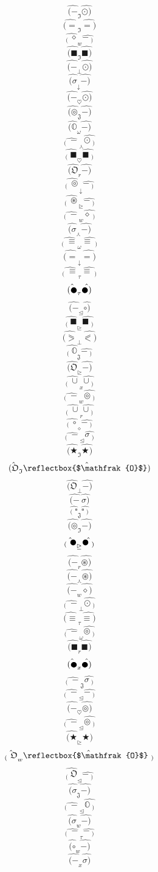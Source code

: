 \documentclass[12pt]{article}
\begin{document}
\begin{multicols}{5}
$$\hat{(-} _\mathfrak{I} \hat{\odot)}$$
$$\hat{(=} _\mathfrak{I} \hat{=)}$$
$$\hat{_( \ \diamond} _w \hat{-\ _)}$$
$$\hat{(\blacksquare} _\mathfrak{I} \hat{\blacksquare)}$$
$$\hat{(-} _\bot \hat{\odot)}$$
$$\hat{(\sigma} _\downarrow \hat{-)}$$
$$\hat{(-} _\heartsuit \hat{\odot)}$$
$$\hat{(\circledcirc} _\mathfrak{J} \hat{-)}$$
$$\hat{(\mathbb{O}} _\omega \hat{-)}$$
$$\hat{_( \ -} _\curlywedge \hat{\odot\ _)}$$
$$\hat{_( \ \blacksquare} _\heartsuit \hat{\blacksquare\ _)}$$
$$\hat{(\mathfrak{O}} _r \hat{-)}$$
$$\hat{_( \ \circledcirc} _\downarrow \hat{-\ _)}$$
$$\hat{_( \ \circledast} _\trianglerighteq \hat{-\ _)}$$
$$\hat{_( \ -} _w \hat{\diamond\ _)}$$
$$\hat{(\sigma} _\curlywedge \hat{-)}$$
$$\hat{_( \ \equiv} _\omega \hat{\equiv\ _)}$$
$$\hat{(=} _\downarrow \hat{=)}$$
$$\hat{_( \ \equiv} _\tau \hat{\equiv\ _)}$$
$$\hat{(\newmoon} _\tau \hat{\newmoon)}$$
$$\hat{(-} _\trianglelefteq \hat{\circ)}$$
$$\hat{_( \ \blacksquare} _\trianglerighteq \hat{\blacksquare\ _)}$$
$$\hat{(\eqslantgtr} _\bot \hat{\eqslantless)}$$
$$\hat{_( \ \mathbb{O}} _\mathfrak{J} \hat{-\ _)}$$
$$\hat{(\mathfrak{O}} _\trianglerighteq \hat{-)}$$
$$\hat{_( \ \cup} _x \hat{\cup\ _)}$$
$$\hat{_( \ -} _w \hat{\circledcirc\ _)}$$
$$\hat{_( \ \cup} _r \hat{\cup\ _)}$$
$$\hat{_( \ \circ} _\diamond \hat{-\ _)}$$
$$\hat{_( \ -} _\trianglelefteq \hat{\sigma\ _)}$$
$$\hat{(\bigstar} _\mathfrak{I} \hat{\bigstar)}$$
$$\hat{(\mathfrak{O}} _\mathfrak{I} \hat{\reflectbox{$\mathfrak{O}$})}$$
$$\hat{(\mathfrak{O}} _\bot \hat{-)}$$
$$\hat{(-} \  \hat{\sigma)}$$
$$\hat{_( \ \square} _\mathfrak{J} \hat{\square\ _)}$$
$$\hat{(\circledcirc} _\mathfrak{I} \hat{-)}$$
$$\hat{_( \ \newmoon} _\trianglerighteq \hat{\newmoon\ _)}$$
$$\hat{(-} _r \hat{\circledast)}$$
$$\hat{(-} _\curlywedge \hat{\circledast)}$$
$$\hat{(-} _w \hat{\diamond)}$$
$$\hat{_( \ -} _\bot \hat{\odot\ _)}$$
$$\hat{(\equiv} _\tau \hat{\equiv)}$$
$$\hat{_( \ -} _\omega \hat{\circledcirc\ _)}$$
$$\hat{(\blacksquare} _r \hat{\blacksquare)}$$
$$\hat{(\newmoon} _x \hat{\newmoon)}$$
$$\hat{_( \ -} _\mathfrak{J} \hat{\sigma\ _)}$$
$$\hat{_( \ -} _\trianglelefteq \hat{-\ _)}$$
$$\hat{(-} _\heartsuit \hat{\circledcirc)}$$
$$\hat{_( \ -} _\trianglelefteq \hat{\circledcirc\ _)}$$
$$\hat{(\bigstar} _\trianglerighteq \hat{\bigstar)}$$
$$\hat{_( \ \mathfrak{O}} _w \hat{\reflectbox{$\mathfrak{O}$}\ _)}$$
$$\hat{_( \ \mathfrak{O}} _\trianglelefteq \hat{-\ _)}$$
$$\hat{(\sigma} _\mathfrak{J} \hat{-)}$$
$$\hat{_( \ -} _\trianglelefteq \hat{\mathbb{O}\ _)}$$
$$\hat{(\sigma} _w \hat{-)}$$
$$\hat{_( \ -} _\tau \hat{-\ _)}$$
$$\hat{(\circ} _w \hat{-)}$$
$$\hat{(-} _x \hat{\sigma)}$$

\end{multicols}
\end{document}
